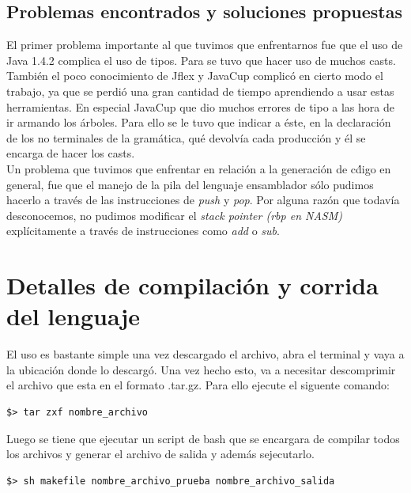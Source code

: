\documentclass[11pt, spanish]{report}
\begin{document}
\newpage

\section{Problemas encontrados y soluciones propuestas}

El primer problema importante al que tuvimos que enfrentarnos fue que el uso de Java 1.4.2 complica el uso de tipos. Para se tuvo que hacer uso de muchos casts. \\

Tambi\'en el poco conocimiento de Jflex y JavaCup complic\'o en cierto modo el trabajo, ya que se perdi\'o una gran cantidad de tiempo aprendiendo a usar estas 
herramientas. En especial JavaCup que dio muchos errores de tipo a las hora de ir armando los \'arboles. Para ello se le tuvo que indicar a \'este, en la declaraci\'on
de los no terminales de la gram\'atica, qu\'e devolv\'ia cada producci\'on y \'el se encarga de hacer los casts.\\

Un problema que tuvimos que enfrentar en relaci\'on a la generaci\'on de c\'digo en general, fue que el manejo de la pila del lenguaje ensamblador s\'olo pudimos hacerlo
a trav\'es de las instrucciones de \emph{push} y \emph{pop}. Por alguna raz\'on que todav\'ia desconocemos, no pudimos modificar el \emph{stack pointer (rbp en NASM)} 
expl\'icitamente a trav\'es de instrucciones como \emph{add} o \emph{sub}.

\chapter{Detalles de compilaci\'on y corrida del lenguaje}
El uso es bastante simple una vez descargado el archivo, abra el terminal y vaya a la ubicaci\'on donde lo descarg\'o. Una vez hecho esto, va a necesitar 
descomprimir el archivo que esta en el formato .tar.gz. Para ello ejecute el siguente comando:\\

\begin{verbatim}
$> tar zxf nombre_archivo
\end{verbatim}

Luego se tiene que ejecutar un script de bash que se encargara de compilar todos los archivos y generar el archivo
de salida y adem\'as sejecutarlo.\\

\begin{verbatim}
$> sh makefile nombre_archivo_prueba nombre_archivo_salida
\end{verbatim}
\end{document}
